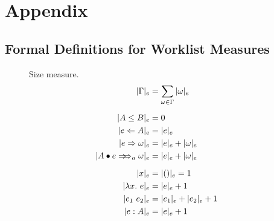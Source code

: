 
\section{Appendix}

\subsection{Formal Definitions for Worklist Measures}

\begin{figure}[h!]
    \begin{minipage}[t]{.5\textwidth}
        \centering{} {Size measure.}
        \begin{gather*}
            \begin{aligned}
            |\Gm|_e &= \sum_{\jg \in \Gm} |\jg|_e\\[2mm]
            |A \le B|_e &= 0\\
            |e \Lto A|_e &= |e|_e\\
            |e \To \jg|_e &= |e|_e + |\jg|_e\\
            |\appInfAlg{A}{e}|_e &= |e|_e + |\jg|_e\\[2mm]
            |x|_e &= |()|_e = 1\\
            \qquad |\lam e|_e &= |e|_e + 1\\
            |e_1~e_2|_e &= |e_1|_e + |e_2|_e + 1\\
            |e:A|_e &= |e|_e + 1
            \end{aligned}
        \end{gather*}
        

\end{minipage}
\end{figure}
